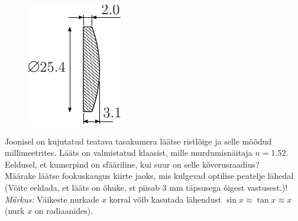 
\begin{figure}
    \vspace{-30pt}
    \begin{center}
        \includegraphics[width=\linewidth]{2023-lahg-08-yl.pdf}
    \end{center}
\end{figure}
Joonisel on kujutatud teatava tasakumera läätse ristlõige ja selle mõõdud millimeetrites. Lääts on valmistatud klaasist, mille murdumisnäitaja $n=\num{1.52}$.\\
\osa Eeldusel, et kumerpind on sfääriline, kui suur on selle kõverusraadius?\\
\osa Määrake läätse fookuskaugus kiirte jaoks, mis kulgevad optilise peatelje lähedal (Võite eeldada, et lääts on õhuke, st piisab 3 mm täpsusega õigest vastusest.)! \\ \emph{Märkus:} Väikeste nurkade $x$ korral võib kasutada lähendust $\sin{x} \approx \tan{x} \approx x$ (nurk $x$ on radiaanides).



